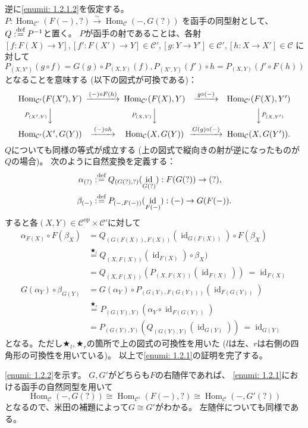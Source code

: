 \documentclass[uplatex,dvipdfmx]{jsarticle}
\makeatletter
\theoremstyle{definition}
\renewenvironment{proof}[1][\proofname]{
  \pushQED{\qed}%
  \normalfont \topsep6\p@\@plus6\p@\relax
  \trivlist
  \item[\hskip\labelsep
    #1\@addpunct{\textbf{.}}]\ignorespaces
}{%
  \popQED\endtrivlist\@endpefalse
}
\providecommand{\proofname}{証明}
\DeclareMathOperator{\Hom}{\mathrm{Hom}}
\DeclareMathOperator{\id}{\mathrm{id}}
\newcommand{\op}{\mathrm{op}}
\newcommand\mcC{\mathcal{C}}
\def\dfn{:\overset{\mbox{{\scriptsize def}}}{=}}
\makeatother
\begin{document}
\begin{proof}
  逆に\ref{enumii: 1.2.1.2}を仮定する。
  \(P:\Hom_{\mcC'}(F(-),?) \xrightarrow{\sim} \Hom_{\mcC}(-,G(?))\)
  を函手の同型射として、\(Q\dfn P^{-1}\)と置く。
  \(P\)が函手の射であることは、各射
  \([f:F(X) \to Y],[f':F(X')\to Y]\in \mcC',
  [g:Y\to Y']\in \mcC', [h:X\to X']\in \mcC\)
  に対して
  \(P_{(X,Y')}(g\circ f) = G(g)\circ P_{(X,Y)}(f),
  P_{(X',Y)}(f')\circ h = P_{(X,Y)}(f'\circ F(h))\)
  となることを意味する
  (以下の図式が可換である)：
  \[
  \begin{CD}
    \Hom_{\mcC'}(F(X'),Y) @> (-)\circ F(h) >>
    \Hom_{\mcC'}(F(X),Y) @> g\circ (-) >>
    \Hom_{\mcC'}(F(X),Y') \\
    @V P_{(X',Y)} VV @V P_{(X,Y)} VV @VV P_{(X,Y')} V \\
    \Hom_{\mcC'}(X',G(Y)) @> (-)\circ h >>
    \Hom_{\mcC}(X,G(Y)) @> G(g) \circ (-) >>
    \Hom_{\mcC}(X,G(Y')).
  \end{CD}
  \]
  \(Q\)についても同様の等式が成立する
  (上の図式で縦向きの射が逆になったものが\(Q\)の場合)。
  次のように自然変換を定義する：
  \begin{align*}
    \alpha_{(?)} &\dfn Q_{(G(?),?)}(\id_{G(?)}): F(G(?)) \to (?), \\
    \beta_{(-)} &\dfn P_{(-,F(-))}(\id_{F(-)}): (-) \to G(F(-)).
  \end{align*}
  すると各\((X,Y)\in \mcC^{\op}\times \mcC'\)に対して
  \begin{align*}
    \alpha_{F(X)} \circ F(\beta_X)
    &= Q_{(G(F(X)),F(X))}(\id_{G(F(X))}) \circ F(\beta_X) \\
    &\overset{\bigstar_l}{=} Q_{(X,F(X))}(\id_{F(X)}) \circ \beta_X) \\
    &= Q_{(X,F(X))}(P_{(X,F(X))}(\id_{F(X)})) \ = \id_{F(X)} \\
    G(\alpha_Y)\circ \beta_{G(Y)}
    &= G(\alpha_Y) \circ P_{(G(Y),F(G(Y)))}(\id_{F(G(Y))})  \\
    &\overset{\bigstar_r}{=} P_{(G(Y),Y)}(\alpha_Y \circ \id_{F(G(Y))})  \\
    &= P_{(G(Y),Y)}(Q_{(G(Y),Y)}(\id_{G(Y)})) \ = \id_{G(Y)}
  \end{align*}
  となる。ただし\(\bigstar_l,\bigstar_r\)の箇所で上の図式の可換性を用いた
  (\(l\)は左、\(r\)は右側の四角形の可換性を用いている)。
  以上で\ref{enumi: 1.2.1}の証明を完了する。

  \ref{enumi: 1.2.2}を示す。
  \(G,G'\)がどちらも\(F\)の右随伴であれば、
  \ref{enumi: 1.2.1}における函手の自然同型を用いて
  \[
  \Hom_{\mcC}(-,G(?)) \cong \Hom_{\mcC'}(F(-),?) \cong \Hom_{\mcC}(-,G'(?))
  \]
  となるので、米田の補題によって\(G\cong G'\)がわかる。
  左随伴についても同様である。


\end{proof}
\end{document}

